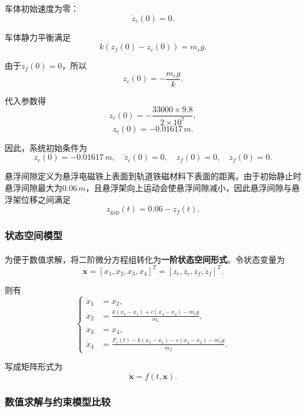 \documentclass[a4paper]{nmmcm}
\newcommand{\upcite}[1]{\textsuperscript{\cite{#1}}}
\begin{document}
车体初始速度为零：
\begin{equation}
\dot{z}_c(0)=0.
\end{equation}

车体静力平衡满足
\begin{equation}
k\left(z_f(0)-z_c(0)\right)=m_cg.
\end{equation}

由于$z_f(0)=0$，所以
\begin{equation}
z_c(0)=-\frac{m_cg}{k}.
\end{equation}

代入参数得
\[
z_c(0)=-\frac{33000\times9.8}{2\times10^7},
\]
\[
z_c(0)=-0.01617\,m.
\]

因此，系统初始条件为
\[
z_c(0)=-0.01617\,m,\quad \dot{z}_c(0)=0,\quad
z_f(0)=0,\quad \dot{z}_f(0)=0.
\]

悬浮间隙定义为悬浮电磁铁上表面到轨道铁磁材料下表面的距离。由于初始静止时悬浮间隙最大为$0.06\,m$，且悬浮架向上运动会使悬浮间隙减小，因此悬浮间隙与悬浮架位移之间满足
\begin{equation}
z_{\text{gap}}(t)=0.06-z_f(t).
\end{equation}

\subsubsection{状态空间模型}

为便于数值求解，将二阶微分方程组转化为\textbf{一阶状态空间形式}\upcite{6}。令状态变量为
\begin{equation}
\mathbf{x}=[x_1,x_2,x_3,x_4]^T
=[z_c,\dot{z}_c,z_f,\dot{z}_f]^T.
\end{equation}

则有
\begin{equation}
\left\{
\begin{aligned}
\dot{x}_1&=x_2,\\
\dot{x}_2&=\frac{k(x_3-x_1)+c(x_4-x_2)-m_cg}{m_c},\\
\dot{x}_3&=x_4,\\
\dot{x}_4&=\frac{F_e(t)-k(x_3-x_1)-c(x_4-x_2)-m_fg}{m_f}.
\end{aligned}
\right.
\end{equation}

写成矩阵形式为
\begin{equation}
\dot{\mathbf{x}}=f(t,\mathbf{x}).
\end{equation}

\subsubsection{数值求解与约束模型比较}
\end{document}
